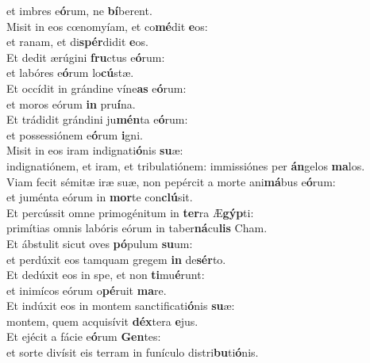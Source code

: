 \oddverse et imbres e\textbf{ó}rum, ne \textbf{bí}berent.\\
\evenverse Misit in eos cœnomyíam, et co\textbf{mé}dit \textbf{e}os:~\*\\
\evenverse et ranam, et di\textbf{spér}didit \textbf{e}os.\\
\oddverse Et dedit ærúgini \textbf{fru}ctus e\textbf{ó}rum:~\*\\
\oddverse et labóres e\textbf{ó}rum lo\textbf{cú}stæ.\\
\evenverse Et occídit in grándine víne\textbf{as} e\textbf{ó}rum:~\*\\
\evenverse et moros eórum \textbf{in} pru\textbf{í}na.\\
\oddverse Et trádidit grándini ju\textbf{mén}ta e\textbf{ó}rum:~\*\\
\oddverse et possessiónem e\textbf{ó}rum \textbf{i}gni.\\
\evenverse Misit in eos iram indignati\textbf{ó}nis \textbf{su}æ:~\*\\
\evenverse indignatiónem, et iram, et tribulatiónem: immissiónes per \textbf{án}gelos \textbf{ma}los.\\
\oddverse Viam fecit sémitæ iræ suæ, non pepércit a morte ani\textbf{má}bus e\textbf{ó}rum:~\*\\
\oddverse et juménta eórum in \textbf{mor}te con\textbf{clú}sit.\\
\evenverse Et percússit omne primogénitum in \textbf{ter}ra Æ\textbf{gýp}ti:~\*\\
\evenverse primítias omnis labóris eórum in taber\textbf{ná}cu\textbf{lis} Cham.\\
\oddverse Et ábstulit sicut oves \textbf{pó}pulum \textbf{su}um:~\*\\
\oddverse et perdúxit eos tamquam gregem \textbf{in} de\textbf{sér}to.\\
\evenverse Et dedúxit eos in spe, et non \textbf{ti}mu\textbf{é}runt:~\*\\
\evenverse et inimícos eórum o\textbf{pé}ruit \textbf{ma}re.\\
\oddverse Et indúxit eos in montem sanctificati\textbf{ó}nis \textbf{su}æ:~\*\\
\oddverse montem, quem acquisívit \textbf{déx}tera \textbf{e}jus.\\
\evenverse Et ejécit a fácie e\textbf{ó}rum \textbf{Gen}tes:~\*\\
\evenverse et sorte divísit eis terram in funículo distri\textbf{bu}ti\textbf{ó}nis.\\
